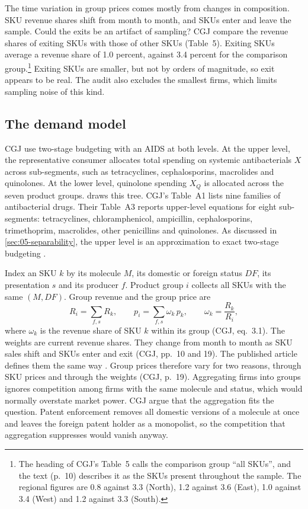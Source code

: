 The time variation in group prices comes mostly from changes in composition. SKU revenue shares shift from month to
month, and SKUs enter and leave the sample. Could the exits be an artifact of sampling? CGJ compare the revenue shares
of exiting SKUs with those of other SKUs (Table~5). Exiting SKUs average a revenue share of 1.0 percent, against 3.4
percent for the comparison group.\footnote{The heading of CGJ's Table~5 calls the comparison group ``all SKUs'', and
the text (p.~10) describes it as the SKUs present throughout the sample. The regional figures are 0.8 against 3.3
(North), 1.2 against 3.6 (East), 1.0 against 3.4 (West) and 1.2 against 3.3 (South).} Exiting SKUs are smaller, but
not by orders of magnitude, so exit appears to be real. The audit also excludes the smallest firms, which limits
sampling noise of this kind.

\subsection{The demand model}\label{sec:05-cgj-demand}

CGJ use two-stage budgeting with an AIDS at both levels. At the upper level, the representative consumer allocates
total spending on systemic antibacterials $X$ across sub-segments, such as tetracyclines, cephalosporins, macrolides
and quinolones. At the lower level, quinolone spending $X_Q$ is allocated across the seven product groups.
 draws this tree. CGJ's Table~A1 lists nine families of antibacterial drugs. Their Table~A3
reports upper-level equations for eight sub-segments: tetracyclines, chloramphenicol, ampicillin, cephalosporins,
trimethoprim, macrolides, other penicillins and quinolones. As discussed in \cref{sec:05-separability}, the upper
level is an approximation to exact two-stage budgeting \citep[pp.~131--132]{DeatonMuellbauer1980b}.

 Index an SKU $k$ by its molecule $M$, its domestic or foreign status $DF$,
its presentation $s$ and its producer $f$. Product group $i$ collects all SKUs with the same $(M, DF)$. Group revenue
and the group price are
\begin{equation}\label{eq:05-cgj-group-price}
R_i = \sum_{f,s} R_k, \qquad p_i = \sum_{f,s}\omega_k\, p_k, \qquad \omega_k = \frac{R_k}{R_i},
\end{equation}
where $\omega_k$ is the revenue share of SKU $k$ within its group (CGJ, eq.~3.1). The weights are current revenue
shares. They change from month to month as SKU sales shift and SKUs enter and exit (CGJ, pp.~10 and 19). The
published article defines them the same way \citep[eq.~1, p.~1487]{ChaudhuriGoldbergJia2006}. Group prices
therefore vary for two reasons, through SKU prices and through the weights (CGJ, p.~19).
Aggregating firms into groups ignores competition among firms
with the same molecule and status, which would normally overstate market power. CGJ argue that the aggregation fits
the question. Patent enforcement removes all domestic versions of a molecule at once and leaves the foreign patent
holder as a monopolist, so the competition that aggregation suppresses would vanish anyway.

